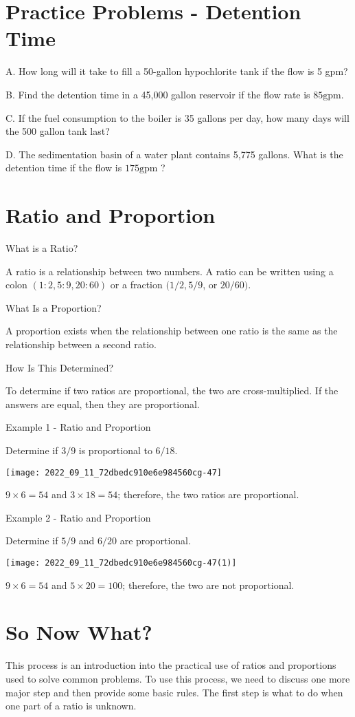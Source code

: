 \section{Practice Problems - Detention Time}
A. How long will it take to fill a 50-gallon hypochlorite tank if the flow is 5 gpm?

B. Find the detention time in a 45,000 gallon reservoir if the flow rate is $85 \mathrm{gpm}$.

C. If the fuel consumption to the boiler is 35 gallons per day, how many days will the 500 gallon tank last?

D. The sedimentation basin of a water plant contains 5,775 gallons. What is the detention time if the flow is $175 \mathrm{gpm}$ ?

\section{Ratio and Proportion}
What is a Ratio?

A ratio is a relationship between two numbers. A ratio can be written using a colon $(1: 2,5: 9,20: 60)$ or a fraction $(1 / 2,5 / 9$, or $20 / 60)$.

What Is a Proportion?

A proportion exists when the relationship between one ratio is the same as the relationship between a second ratio.

How Is This Determined?

To determine if two ratios are proportional, the two are cross-multiplied. If the answers are equal, then they are proportional.

Example 1 - Ratio and Proportion

Determine if $3 / 9$ is proportional to $6 / 18$.

\texttt{[image: 2022\_09\_11\_72dbedc910e6e984560cg-47]}

$9 \times 6=54$ and $3 \times 18=54$; therefore, the two ratios are proportional.

Example 2 - Ratio and Proportion

Determine if $5 / 9$ and $6 / 20$ are proportional.

\texttt{[image: 2022\_09\_11\_72dbedc910e6e984560cg-47(1)]}

$9 \times 6=54$ and $5 \times 20=100$; therefore, the two are not proportional.

\section{So Now What?}
This process is an introduction into the practical use of ratios and proportions used to solve common problems. To use this process, we need to discuss one more major step and then provide some basic rules. The first step is what to do when one part of a ratio is unknown.

